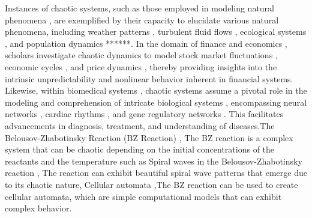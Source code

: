 \documentclass[11pt]{article}
\theoremstyle{definition}
\begin{document}
Instances of chaotic systems, such as those employed in modeling natural phenomena \cite{sanabria_modelling_2020}, are exemplified by their capacity to elucidate various natural phenomena, including weather patterns \cite{noauthor_weather_nodate}, turbulent fluid flows \cite{noauthor_turbulent_nodate}, ecological systems \cite{crawford_ecological_2020}, and population dynamics \cite{noauthor_population_nodate}******. In the domain of finance and economics \cite{liao_study_2020}, scholars investigate chaotic dynamics to model stock market fluctuations \cite{vogl_chaos_2024}, economic cycles \cite{tusset_dynamic_2023}, and price dynamics \cite{ait_omar_chaotic_2022}, thereby providing insights into the intrinsic unpredictability and nonlinear behavior inherent in financial systems. Likewise, within biomedical systems \cite{grigorenko_study_2022}, chaotic systems assume a pivotal role in the modeling and comprehension of intricate biological systems \cite{li_incorporating_2023}, encompassing neural networks \cite{lin_chaotic_2020}, cardiac rhythms \cite{cheffer_biochaos_2022}, and gene regulatory networks \cite{uthamacumaran_review_2021}. This facilitates advancements in diagnosis, treatment, and understanding of diseases.The Belousov-Zhabotinsky Reaction (BZ Reaction) \cite{karimov_empirically_2023}, The BZ reaction is a complex system that can be chaotic depending on the initial concentrations of the reactants and the temperature such as Spiral waves in the Belousov-Zhabotinsky reaction \cite{luengviriya_meandering_2013}, The reaction can exhibit beautiful spiral wave patterns that emerge due to its chaotic nature, Cellular automata \cite{chopard_cellular_2022},The BZ reaction can be used to create cellular automata, which are simple computational models that can exhibit complex behavior.
\end{document}
